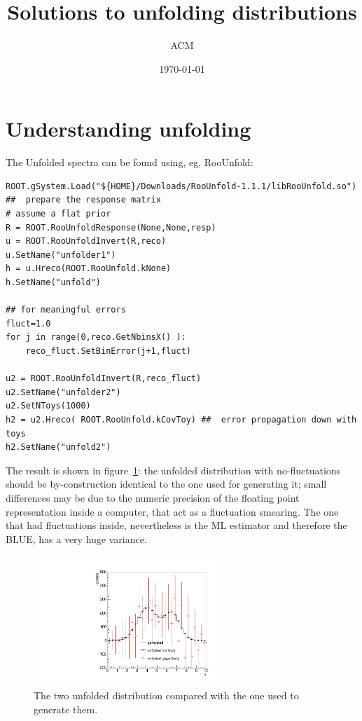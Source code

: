 \documentclass[a4paper,11pt]{article}
\title{Solutions to unfolding distributions}
\author{ACM}
\date{\today}
\begin{document}
\maketitle

\section{Understanding unfolding}

The Unfolded spectra can be found using, eg, RooUnfold:
\begin{verbatim}
ROOT.gSystem.Load("${HOME}/Downloads/RooUnfold-1.1.1/libRooUnfold.so")
##  prepare the response matrix
# assume a flat prior
R = ROOT.RooUnfoldResponse(None,None,resp)
u = ROOT.RooUnfoldInvert(R,reco)
u.SetName("unfolder1")
h = u.Hreco(ROOT.RooUnfold.kNone) 
h.SetName("unfold")

## for meaningful errors
fluct=1.0
for j in range(0,reco.GetNbinsX() ):
	reco_fluct.SetBinError(j+1,fluct)

u2 = ROOT.RooUnfoldInvert(R,reco_fluct)
u2.SetName("unfolder2")
u2.SetNToys(1000)
h2 = u2.Hreco( ROOT.RooUnfold.kCovToy) ##  error propagation down with toys
h2.SetName("unfold2")

\end{verbatim}

The result is shown in figure~\ref{fig:sol1}: the unfolded distribution with no-fluctuations should be by-construction identical to the one used for generating it; 
small differences may be due to the numeric precision of the floating point representation inside a computer, that act as a fluctuation smearing. 
The one that had fluctuations inside, nevertheless is the \gls{ML} estimator and therefore the \gls{BLUE}, has a very huge variance.

\begin{figure}[H]
	\centering
	\includegraphics[width=0.618\textwidth]{figs/gen-unfold.pdf}
	\caption{ \label{fig:sol1} The two unfolded distribution compared with the one used to generate them.}
\end{figure}
\end{document}
